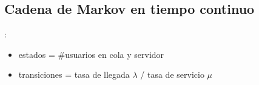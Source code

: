 \documentclass{beamer}
\newtheorem{definicion}{Definición}[section]
\begin{document}
\subsection{Cadena de Markov en tiempo continuo}

\begin{frame}{\secname: \subsecname}
    \begin{figure}
        
    \end{figure}

    \begin{figure}
        
    \end{figure}


    \vfill

    \begin{itemize}
        \item estados = \#usuarios en
            cola y servidor
        \item transiciones =
            tasa de llegada $\lambda$ /
            tasa de servicio $\mu$
    \end{itemize}
\end{frame}








\end{document}
